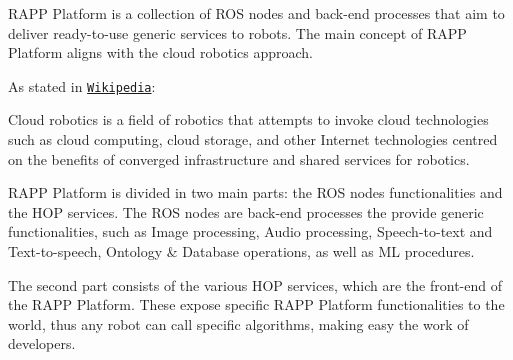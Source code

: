 R\-A\-P\-P Platform is a collection of R\-O\-S nodes and back-\/end processes that aim to deliver ready-\/to-\/use generic services to robots. The main concept of R\-A\-P\-P Platform aligns with the cloud robotics approach.

As stated in \href{https://en.wikipedia.org/wiki/Cloud_robotics}{\tt Wikipedia}\-:

\begin{quotation}


\end{quotation}
Cloud robotics is a field of robotics that attempts to invoke cloud technologies such as cloud computing, cloud storage, and other Internet technologies centred on the benefits of converged infrastructure and shared services for robotics. \begin{quotation}


\end{quotation}


R\-A\-P\-P Platform is divided in two main parts\-: the R\-O\-S nodes functionalities and the H\-O\-P services. The R\-O\-S nodes are back-\/end processes the provide generic functionalities, such as Image processing, Audio processing, Speech-\/to-\/text and Text-\/to-\/speech, Ontology \& Database operations, as well as M\-L procedures.

The second part consists of the various H\-O\-P services, which are the front-\/end of the R\-A\-P\-P Platform. These expose specific R\-A\-P\-P Platform functionalities to the world, thus any robot can call specific algorithms, making easy the work of developers. 